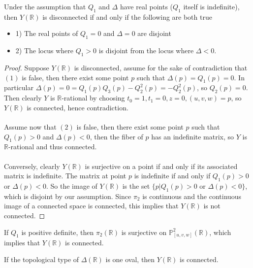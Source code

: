 \documentclass{article}
\newcommand{\Rbb}{\mathbb{R}}
\newcommand{\Pbb}{\mathbb{P}}
\begin{document}
\begin{proposition}
Under the assumption that $Q_1$ and $\Delta$ have real points ($Q_1$ itself is indefinite), then $Y(\Rbb)$ is disconnected if and only if the following are both true
\begin{itemize}
    \item 1) The real points of $Q_1 = 0$ and $\Delta = 0$ are disjoint
    \item 2) The locus where $Q_1 > 0$ is disjoint from the locus where $\Delta < 0$.
\end{itemize}
\end{proposition}

\begin{proof}
Suppose $Y(\Rbb)$ is disconnected, assume for the sake of contradiction that $(1)$ is false, then there exist some point $p$ such that $\Delta(p) = Q_1(p) = 0$. In particular $\Delta(p) = 0 = Q_1(p)Q_3(p) - Q_2^2(p) = -Q_2^2(p)$, so $Q_2(p) = 0$. Then clearly $Y$ is $\Rbb$-rational by choosing $t_0 = 1, t_1 = 0, z = 0, (u, v, w) = p$, so $Y(\Rbb)$ is connected, hence contradiction.\\\\
Assume now that $(2)$ is false, then there exist some point $p$ such that $Q_1(p) > 0$ and $\Delta(p) < 0$, then the fiber of $p$ has an indefinite matrix, so $Y$ is $\Rbb$-rational and thus connected.
\\\\
Conversely, clearly $Y(\Rbb)$ is surjective on a point if and only if its associated matrix is indefinite. The matrix at point $p$ is indefinite if and only if $Q_1(p) > 0$ or $\Delta(p) < 0$. So the image of $Y(\Rbb)$ is the set $\{p | Q_1(p) > 0 \text{ or } \Delta(p) < 0\}$, which is disjoint by our assumption. Since $\pi_2$ is continuous and the continuous image of a connected space is connected, this implies that $Y(\Rbb)$ is not connected.
\end{proof}

\begin{proposition}
If $Q_1$ is positive definite, then $\pi_2(\Rbb)$ is surjective on $\Pbb^2_{[u, v, w]}(\Rbb)$, which implies that $Y(\Rbb)$ is connected.
\end{proposition}

\begin{proposition}
If the topological type of $\Delta(\Rbb)$ is one oval, then $Y(\Rbb)$ is connected.
\end{proposition}
\end{document}

